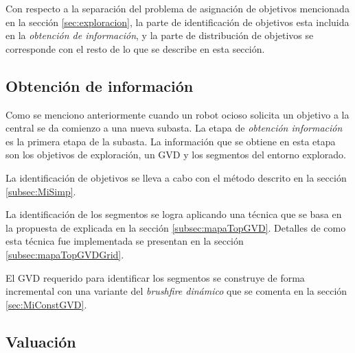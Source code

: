 Con respecto a la separación del problema de asignación de objetivos mencionada
en la sección \ref{sec:exploracion}, la parte de identificación de objetivos
esta incluida en la \emph{obtención de información}, y la parte de
distribución de objetivos se corresponde con el resto de lo que se describe
en esta sección.

\subsection{Obtención de información}\label{subsec:obtInfo}
Como se menciono anteriormente cuando un robot ocioso solicita un objetivo a la
central se da comienzo a una nueva subasta.
La etapa de \emph{obtención información} es la primera etapa de la subasta. La
información que se obtiene en esta etapa son los objetivos de exploración, un
GVD y los segmentos del entorno explorado.

La identificación de objetivos se lleva a cabo con el método descrito en la
sección \ref{subsec:MiSimp}.

La identificación de los segmentos se logra aplicando una técnica que se basa
en la propuesta de \cite{Thrun1998} explicada en la sección
\ref{subsec:mapaTopGVD}. Detalles de como esta técnica fue implementada se
presentan en la sección \ref{subsec:mapaTopGVDGrid}. 

El GVD requerido para identificar los segmentos se construye de forma
incremental con una variante del \emph{brushfire dinámico} que se comenta en la
sección \ref{sec:MiConstGVD}.

\subsection{Valuación} \label{subsec:MiValSub}

